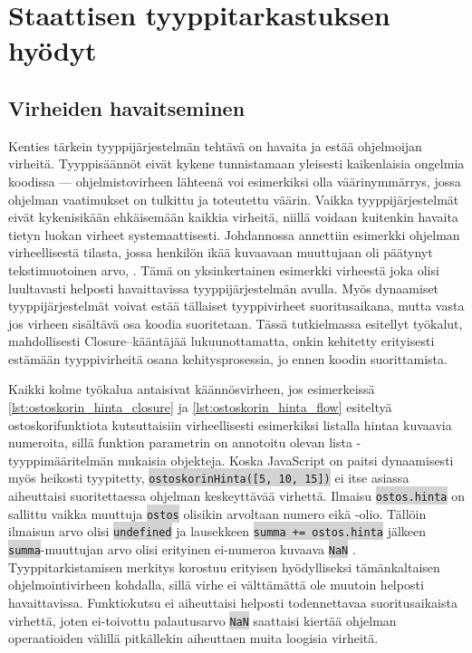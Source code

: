 \chapter{Staattisen tyyppitarkastuksen hyödyt}

\section{Virheiden havaitseminen}

Kenties tärkein tyyppijärjestelmän tehtävä on havaita ja estää
ohjelmoijan virheitä. Tyyppisäännöt eivät kykene tunnistamaan yleisesti
kaikenlaisia ongelmia koodissa — ohjelmistovirheen lähteenä voi esimerkiksi olla
väärinymmärrys, jossa ohjelman vaatimukset on tulkittu ja toteutettu väärin.
Vaikka tyyppijärjestelmät eivät kykenisikään ehkäisemään kaikkia
virheitä, niillä voidaan kuitenkin havaita tietyn luokan virheet
systemaattisesti. Johdannossa annettiin esimerkki ohjelman virheellisestä
tilasta, jossa henkilön ikää kuvaavaan muuttujaan oli päätynyt tekstimuotoinen
arvo, . Tämä on yksinkertainen esimerkki virheestä joka
olisi luultavasti helposti havaittavissa tyyppijärjestelmän
avulla. Myös dynaamiset tyyppijärjestelmät voivat estää tällaiset tyyppivirheet
suoritusaikana, mutta vasta jos virheen sisältävä osa koodia suoritetaan.
Tässä tutkielmassa esitellyt työkalut, mahdollisesti Closure–kääntäjää
lukuunottamatta, onkin kehitetty erityisesti estämään tyyppivirheitä
osana kehitysprosessia, jo ennen koodin suorittamista.

Kaikki kolme työkalua antaisivat käännösvirheen, jos esimerkeissä
\ref{lst:ostoskorin_hinta_closure} ja \ref{lst:ostoskorin_hinta_flow}
esiteltyä ostoskorifunktiota kutsuttaisiin virheellisesti esimerkiksi listalla
hintaa kuvaavia numeroita, sillä funktion parametrin on annotoitu olevan
lista -tyyppimääritelmän mukaisia objekteja. Koska
JavaScript on paitsi dynaamisesti myös heikosti tyypitetty,\newline
\colorbox{lightgray}{\lstinline|ostoskorinHinta([5, 10, 15])|} ei itse
asiassa aiheuttaisi suoritettaessa ohjelman\newline
keskeyttävää virhettä. Ilmaisu 
\colorbox{lightgray}{\lstinline|ostos.hinta|} on sallittu vaikka
muuttuja \colorbox{lightgray}{\lstinline|ostos|} olisikin arvoltaan numero
eikä -olio. Tällöin ilmaisun arvo olisi \colorbox{lightgray}{\lstinline|undefined|}
ja lausekkeen \colorbox{lightgray}{\lstinline|summa += ostos.hinta|} jälkeen
\colorbox{lightgray}{\lstinline|summa|}-muuttujan arvo olisi erityinen
ei-numeroa kuvaava \colorbox{lightgray}{\lstinline|NaN|} \cite{Ecma262NaN}.
Tyyppitarkistamisen merkitys korostuu erityisen hyödylliseksi
tämänkaltaisen ohjelmointivirheen kohdalla, sillä virhe ei välttämättä ole
muutoin helposti havaittavissa. Funktiokutsu ei aiheuttaisi helposti
todennettavaa suoritusaikaista virhettä, joten ei-toivottu palautusarvo
\colorbox{lightgray}{\lstinline|NaN|} saattaisi kiertää ohjelman
operaatioiden välillä pitkällekin aiheuttaen muita loogisia virheitä.

